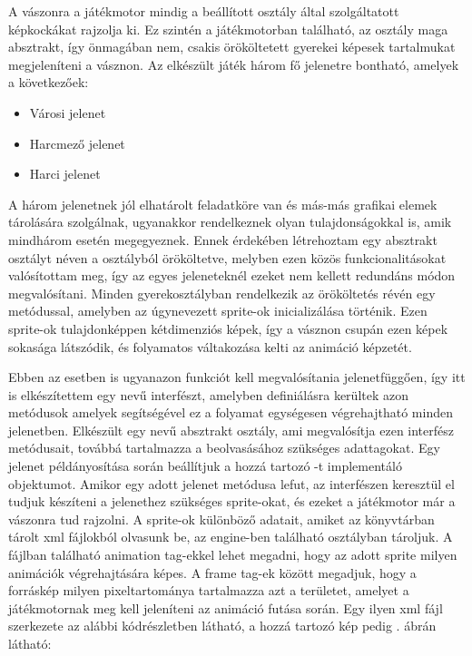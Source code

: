 A vászonra a játékmotor mindig a beállított  osztály által szolgáltatott képkockákat rajzolja ki. 
Ez szintén a játékmotorban található, az osztály maga absztrakt, így önmagában nem, csakis örököltetett gyerekei képesek tartalmukat megjeleníteni a vásznon. 
Az elkészült játék három fő jelenetre bontható, amelyek a következőek:

\begin{itemize}
	\item Városi jelenet 
	\item Harcmező jelenet 
	\item Harci jelenet 
\end{itemize}

A három jelenetnek jól elhatárolt feladatköre van és más-más grafikai elemek tárolására szolgálnak, ugyanakkor rendelkeznek olyan tulajdonságokkal is, amik mindhárom esetén megegyeznek. 
Ennek érdekében létrehoztam egy absztrakt osztályt  néven a  osztályból örököltetve, melyben ezen közös funkcionalitásokat valósítottam meg, így az egyes jeleneteknél ezeket nem kellett redundáns módon megvalósítani. 
Minden gyerekosztályban rendelkezik az örököltetés révén egy  metódussal, amelyben az úgynevezett sprite-ok inicializálása történik. 
Ezen sprite-ok tulajdonképpen kétdimenziós képek, így a vásznon csupán ezen képek sokasága látszódik, és folyamatos váltakozása kelti az animáció képzetét. 

Ebben az esetben is ugyanazon funkciót kell megvalósítania jelenetfüggően, így itt is elkészítettem egy  nevű interfészt, amelyben definiálásra kerültek azon metódusok amelyek segítségével ez a folyamat egységesen végrehajtható minden jelenetben. 
Elkészült egy  nevű absztrakt osztály, ami megvalósítja ezen interfész metódusait, továbbá tartalmazza a beolvasásához szükséges adattagokat. 
Egy jelenet példányosítása során beállítjuk a hozzá tartozó -t implementáló objektumot. 
Amikor egy adott jelenet  metódusa lefut, az interfészen keresztül el tudjuk készíteni a jelenethez szükséges sprite-okat, és ezeket a játékmotor már a vászonra tud rajzolni. 
A sprite-ok különböző adatait, amiket az  könyvtárban tárolt xml fájlokból olvasunk be, az engine-ben található  osztályban tároljuk. 
A fájlban található animation tag-ekkel lehet megadni, hogy az adott sprite milyen animációk végrehajtására képes. 
A frame tag-ek között megadjuk, hogy a forráskép milyen pixeltartománya tartalmazza azt a területet, amelyet a játékmotornak meg kell jeleníteni az animáció futása során. 
Egy ilyen xml fájl szerkezete az alábbi kódrészletben látható, a hozzá tartozó kép pedig . ábrán látható:

